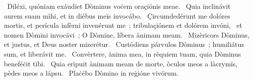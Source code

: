 ~Diléxi, quóniam exáudiet Dòminus voċem oraçiónis meae. 
~Quia inclinávit aurem suam mìhi, et in diébus meïs invocábo. 
~Çircumdedérunt me dolóres mortis, et perícula infèrni invenérunt me~; tribulaçiónem et dolórem invóni, 
~et nomen Dòmini invocávi~; O Dòmine, líbera ànimam meam. 
~Mizèricors Dòminus, et justus, et Deus noster mizerétur. 
~Custódiens párvulos Dòminus~; humiliátus sum, et liberávit me. 
~Convèrtere, ànima mea, in rèquiem tuam, quia Dòminus beneféċit tìbi. 
~Quia erìpuit ànimam meam de morte, òculos meos a làcrymïs, pèdes meos a lápsu. 
~Plaċébo Dòmino in reġióne vivórum. 
